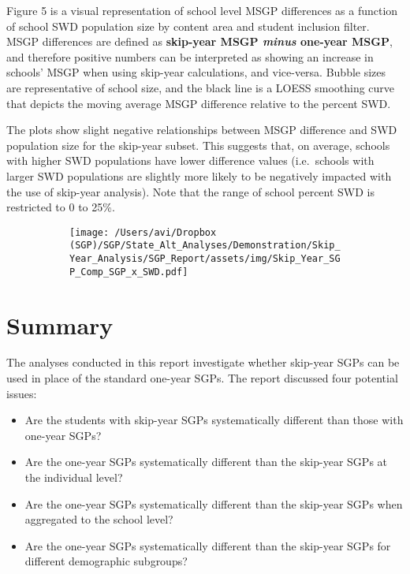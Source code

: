 \documentclass[12pt]{article}
\providecommand{\tightlist}{%
  \setlength{\itemsep}{0pt}\setlength{\parskip}{0pt}}
\begin{document}
Figure 5 is a visual representation of school level MSGP differences as
a function of school SWD population size by content area and student
inclusion filter. MSGP differences are defined as \textbf{skip-year MSGP
\emph{minus} one-year MSGP}, and therefore positive numbers can be
interpreted as showing an increase in schools' MSGP when using skip-year
calculations, and vice-versa. Bubble sizes are representative of school
size, and the black line is a LOESS smoothing curve that depicts the
moving average MSGP difference relative to the percent SWD.

The plots show slight negative relationships between MSGP difference and
SWD population size for the skip-year subset. This suggests that, on
average, schools with higher SWD populations have lower difference
values (i.e.~schools with larger SWD populations are slightly more
likely to be negatively impacted with the use of skip-year analysis).
Note that the range of school percent SWD is restricted to 0 to 25\%.

\begin{figure}[H]
\caption*{{{\bf{Figure 5:}} } Mean SGP difference by percent SWD by content area and student inclusion filter}
  \begin{subfigure}[b]{1\textwidth}
    \texttt{[image: /Users/avi/Dropbox (SGP)/SGP/State\_Alt\_Analyses/Demonstration/Skip\_Year\_Analysis/SGP\_Report/assets/img/Skip\_Year\_SGP\_Comp\_SGP\_x\_SWD.pdf]}
  \end{subfigure}
\end{figure}

\pagebreak

\hypertarget{summary}{%
\section{Summary}\label{summary}}

The analyses conducted in this report investigate whether skip-year SGPs
can be used in place of the standard one-year SGPs. The report discussed
four potential issues:

\begin{itemize}
\tightlist
\item
  Are the students with skip-year SGPs systematically different than
  those with one-year SGPs?
\item
  Are the one-year SGPs systematically different than the skip-year SGPs
  at the individual level?
\item
  Are the one-year SGPs systematically different than the skip-year SGPs
  when aggregated to the school level?
\item
  Are the one-year SGPs systematically different than the skip-year SGPs
  for different demographic subgroups?
\end{itemize}
\end{document}

